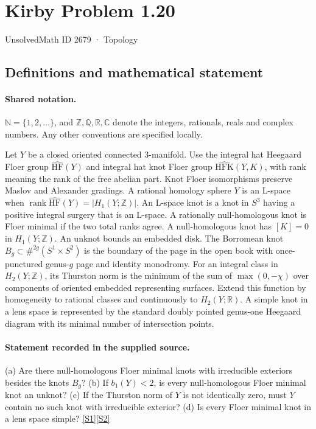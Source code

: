 \documentclass[11pt]{article}
\newcommand{\sref}[2]{\hyperlink{source:#1:#2}{[S#2]}}
\begin{document}
\setcounter{section}{2678}
\section{Kirby Problem 1.20}\label{2679}
{\small\sffamily UnsolvedMath ID 2679 · Topology}
\subsection{Definitions and mathematical statement}

\paragraph{Shared notation.}$\mathbb N=\{1,2,\ldots\}$, and $\mathbb Z,\mathbb Q,\mathbb R,\mathbb C$ denote the integers, rationals, reals and complex numbers. Any other conventions are specified locally.


Let $Y$ be a closed oriented connected $3$-manifold. Use the integral hat Heegaard Floer group $\widehat{\mathrm{HF}}(Y)$ and integral hat knot Floer group $\widehat{\mathrm{HFK}}(Y,K)$, with rank meaning the rank of the free abelian part. Knot Floer isomorphisms preserve Maslov and Alexander gradings. A rational homology sphere $Y$ is an L-space when $\operatorname{rank}\widehat{\mathrm{HF}}(Y)=|H_1(Y;\mathbb Z)|$. An L-space knot is a knot in $S^3$ having a positive integral surgery that is an L-space. A rationally null-homologous knot is Floer minimal if the two total ranks agree. A null-homologous knot has $[K]=0$ in $H_1(Y;\mathbb Z)$. An unknot bounds an embedded disk. The Borromean knot $B_g\subset\#^{2g}(S^1\times S^2)$ is the boundary of the page in the open book with once-punctured genus-$g$ page and identity monodromy. For an integral class in $H_2(Y;\mathbb Z)$, its Thurston norm is the minimum of the sum of $\max(0,-\chi)$ over components of oriented embedded representing surfaces. Extend this function by homogeneity to rational classes and continuously to $H_2(Y;\mathbb R)$. A simple knot in a lens space is represented by the standard doubly pointed genus-one Heegaard diagram with its minimal number of intersection points.
\paragraph{Statement recorded in the supplied source.}
(a) Are there null-homologous Floer minimal knots with irreducible exteriors besides the knots $B_g$? (b) If $b_1(Y)<2$, is every null-homologous Floer minimal knot an unknot? (c) If the Thurston norm of $Y$ is not identically zero, must $Y$ contain no such knot with irreducible exterior? (d) Is every Floer minimal knot in a lens space simple? \sref{2679}{1}\sref{2679}{2}
\end{document}
